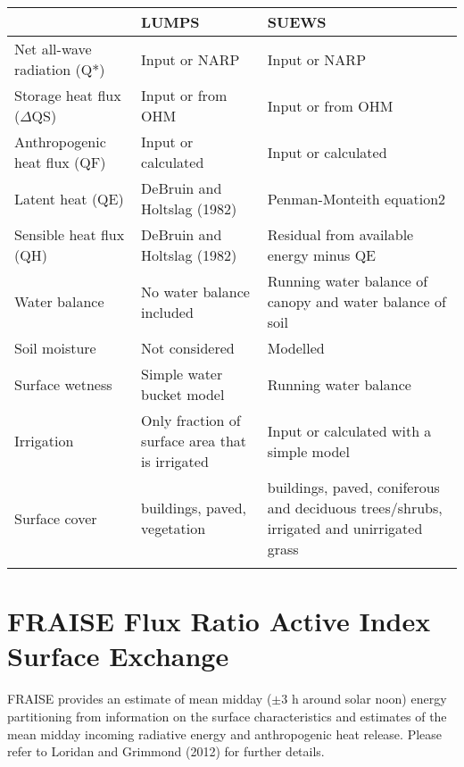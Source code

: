 \documentclass[letterpaper,10pt,english]{sphinxmanual}
\begin{document}
\begin{savenotes}\sphinxattablestart
\centering
\begin{tabulary}{\linewidth}[t]{|T|T|T|}
\hline
\sphinxstyletheadfamily &\sphinxstyletheadfamily 
LUMPS
&\sphinxstyletheadfamily 
SUEWS
\\
\hline
Net all-wave
radiation (Q*)
&
Input or NARP
&
Input or NARP
\\
\hline
Storage heat flux
(\(\Delta\)QS)
&
Input or from OHM
&
Input or from OHM
\\
\hline
Anthropogenic heat
flux (QF)
&
Input or calculated
&
Input or calculated
\\
\hline
Latent heat (QE)
&
DeBruin and Holtslag
(1982)
&
Penman-Monteith
equation2
\\
\hline
Sensible heat flux
(QH)
&
DeBruin and Holtslag
(1982)
&
Residual from
available energy
minus QE
\\
\hline
Water balance
&
No water balance
included
&
Running water balance
of canopy and water
balance of soil
\\
\hline
Soil moisture
&
Not considered
&
Modelled
\\
\hline
Surface wetness
&
Simple water bucket
model
&
Running water balance
\\
\hline
Irrigation
&
Only fraction of
surface area that is
irrigated
&
Input or calculated
with a simple model
\\
\hline
Surface cover
&
buildings, paved,
vegetation
&
buildings, paved,
coniferous and
deciduous
trees/shrubs,
irrigated and
unirrigated grass
\\
\hline&&\\
\hline
\end{tabulary}
\par
\sphinxattableend\end{savenotes}


\section{FRAISE Flux Ratio \textendash{} Active Index Surface Exchange}
\label{\detokenize{differences-suews-lumps-fraise:fraise-flux-ratio-active-index-surface-exchange}}
FRAISE provides an estimate of mean midday (\(\pm\)3 h around solar noon)
energy partitioning from information on the surface characteristics and
estimates of the mean midday incoming radiative energy and anthropogenic
heat release. Please refer to Loridan and Grimmond (2012) \label{\detokenize{differences-suews-lumps-fraise:id1}}{\hyperref[\detokenize{references:lg2012}]{\sphinxcrossref{{[}LG2012{]}}}} for
further details.
\end{document}
